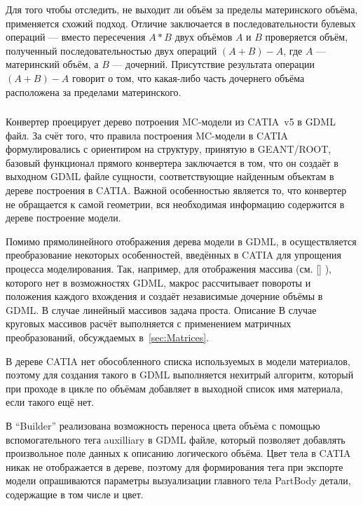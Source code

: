 Для того чтобы отследить, не выходит ли объём за пределы материнского объёма, применяется схожий подход. Отличие заключается в последовательности булевых операций --- вместо пересечения $A*B$ двух объёмов $A$ и $B$ проверяется объём, полученный последовательностью двух операций $(A+B)-A$, где $A$ --- материнский объём, а $B$ --- дочерний. Присутствие результата операции $(A+B)-A$ говорит о том, что какая-либо часть дочернего объёма расположена за пределами материнского.

\subsubsection{}\label{sec:CATIA2GDML}

Конвертер  проецирует дерево потроения MC-модели из CATIA~v5 в GDML файл. За счёт того, что правила построения MC-модели в CATIA формулировались с ориентиром на структуру, принятую в GEANT/ROOT, базовый функционал прямого конвертера заключается в том, что он создаёт в выходном GDML файле сущности, соответствующие найденным объектам в дереве построения в CATIA. Важной особенностью является то, что конвертер не обращается к самой геометрии, вся необходимая информацию содержится в дереве построение модели.

Помимо прямолинейного отображения дерева модели в GDML, в  осуществляется преобразование некоторых особенностей, введённых в CATIA для упрощения процесса моделирования. Так, например, для отображения массива (см. \ref{} \todo), которого нет в возможностях GDML, макрос рассчитывает повороты и положения каждого вхождения и создаёт независимые дочерние объёмы в GDML. В случае линейный массивов задача проста. Описание \todo В случае круговых массивов расчёт выполняется с применением матричных преобразований, обсуждаемых в~\ref{sec:Matrices}.

В дереве CATIA нет обособленного списка используемых в модели материалов, поэтому для создания такого в GDML выполняется нехитрый алгоритм, который при проходе в цикле по объёмам добавляет в выходной список имя материала, если такого ещё нет.

В ``Builder'' реализована возможность переноса цвета объёма с помощью вспомогательного тега auxilliary в GDML файле, который позволяет добавлять произвольное поле данных к описанию логического объёма. Цвет тела в CATIA никак не отображается в дереве, поэтому для формирования тега при экспорте модели опрашиваются параметры вызуализации главного тела PartBody детали, содержащие в том числе и цвет.

